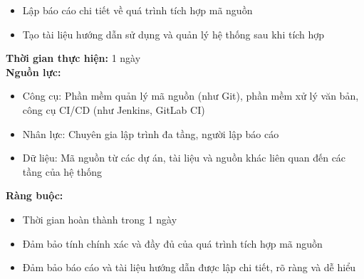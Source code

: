 {\begin{minipage}{\textwidth}
\begin{itemize}
        \item Lập báo cáo chi tiết về quá trình tích hợp mã nguồn
        \item Tạo tài liệu hướng dẫn sử dụng và quản lý hệ thống sau khi tích hợp
    \end{itemize}
    \noindent \textbf{Thời gian thực hiện:} 1 ngày \\
    \noindent \textbf{Nguồn lực:}
    \begin{itemize}
        \item Công cụ: Phần mềm quản lý mã nguồn (như Git), phần mềm xử lý văn bản, công cụ CI/CD (như Jenkins, GitLab CI)
        \item Nhân lực: Chuyên gia lập trình đa tầng, người lập báo cáo
        \item Dữ liệu: Mã nguồn từ các dự án, tài liệu và nguồn khác liên quan đến các tầng của hệ thống
    \end{itemize}
    \noindent \textbf{Ràng buộc:}
    \begin{itemize}
        \item Thời gian hoàn thành trong 1 ngày
        \item Đảm bảo tính chính xác và đầy đủ của quá trình tích hợp mã nguồn
        \item Đảm bảo báo cáo và tài liệu hướng dẫn được lập chi tiết, rõ ràng và dễ hiểu
    \end{itemize}
    \end{minipage}
}
\newpage
{}    

